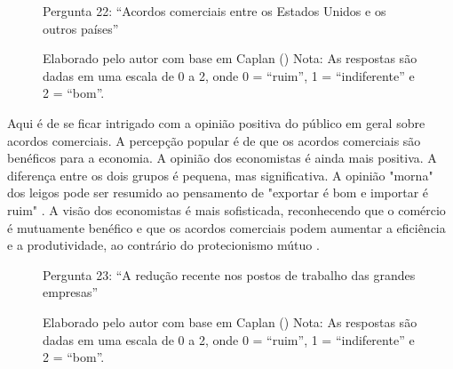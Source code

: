 \begin{figure}[H]
    \centering
    \caption*{Pergunta 22: “Acordos comerciais entre os Estados Unidos e os outros países”}
    \caption{Elaborado pelo autor com base em Caplan (\citeyear{The_Myth_of_the_Rational_Voter}) \newline
    Nota: As respostas são dadas em uma escala de 0 a 2, onde 0 = “ruim”, 1 = “indiferente” e 2 = “bom”.}
    \label{fig:pergunta_22}
\end{figure}

Aqui é de se ficar intrigado com a opinião positiva do público em geral sobre acordos comerciais. A percepção popular é de que os acordos comerciais são benéficos para a economia. A opinião dos economistas é ainda mais positiva. A diferença entre os dois grupos é pequena, mas significativa. A opinião "morna" dos leigos pode ser resumido ao pensamento de "exportar é bom e importar é ruim" \cite{kull2000americans}. A visão dos economistas é mais sofisticada, reconhecendo que o comércio é mutuamente benéfico e que os acordos comerciais podem aumentar a eficiência e a produtividade, ao contrário do protecionismo mútuo \cite{bhagwati2003free}.



\begin{figure}[H]
    \centering
    \caption*{Pergunta 23: “A redução recente nos postos de trabalho das grandes empresas”}
    \caption{Elaborado pelo autor com base em Caplan (\citeyear{The_Myth_of_the_Rational_Voter}) \newline
    Nota: As respostas são dadas em uma escala de 0 a 2, onde 0 = “ruim”, 1 = “indiferente” e 2 = “bom”.}
    \label{fig:pergunta_23}
\end{figure}

